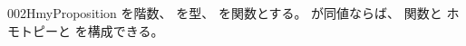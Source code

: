 \documentclass[index]{subfiles}
\begin{document}
\begin{myBlock}{002H}{myProposition}
  を階数、
  を型、
  を関数とする。
  が同値ならば、
  関数と
  ホモトピーと
  を構成できる。
\end{myBlock}
\end{document}
